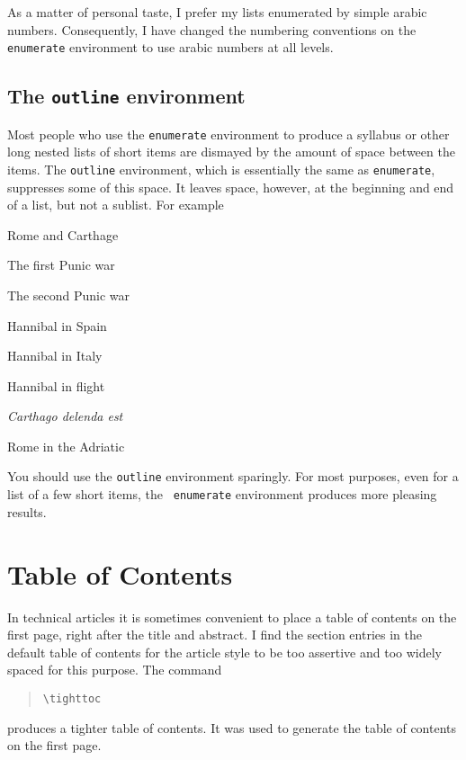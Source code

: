 As a matter of personal taste, I prefer my lists enumerated by simple
arabic numbers.  Consequently, I have changed the numbering
conventions on the {\tt enumerate} environment to use arabic numbers
at all levels.

\subsection{The {\tt outline} environment}

Most people who use the {\tt enumerate} environment to produce a
syllabus or other long nested lists of short items are dismayed
by the amount of space between the items.  The {\tt outline}
environment, which is essentially the same as {\tt enumerate},
suppresses some of this space.  It leaves space, however, at the
beginning and end of a list, but not a sublist.  For example
\begin{outline}
\item Rome and Carthage
   \begin{outline}
   \item The first Punic war
   \item The second Punic war
      \begin{outline}
      \item Hannibal in Spain
      \item Hannibal in Italy
      \item Hannibal in flight
      \end{outline}
   \item {\it Carthago delenda est}
   \end{outline}
\item Rome in the Adriatic
\end{outline}
You should use the {\tt outline} environment sparingly.  For
most purposes, even for a list of a few short items, the {\tt
enumerate} environment produces more pleasing results.

\section{Table of Contents}

In technical articles it is sometimes convenient to place a
table of contents on the first page, right after the title and
abstract.  I find the section entries in the default table of
contents for the article style to be too assertive and too
widely spaced for this purpose.  The command
\begin{quote}
\begin{verbatim}
\tighttoc
\end{verbatim}
\end{quote}
produces a tighter table of contents.  It was used to generate
the table of contents on the first page.

